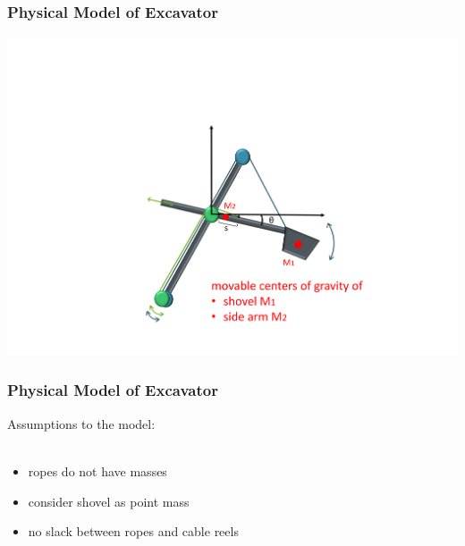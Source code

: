 \documentclass{beamer}
\begin{document}
\begin{frame}
	\frametitle{Physical Model of Excavator}
	
	\includegraphics[trim=22cm 5cm 2cm 23cm, clip=true, width=\linewidth]{Exc/Excavator_mass2}
	
\end{frame}

\begin{frame}
	\frametitle{Physical Model of Excavator}
	
	
	Assumptions to the model:\\
	$ $ \\
	\begin{itemize}
		\item ropes do not have masses
		\item consider shovel as point mass %
		\item no slack between ropes and cable reels
	\end{itemize}
	
\end{frame}
\end{document}
